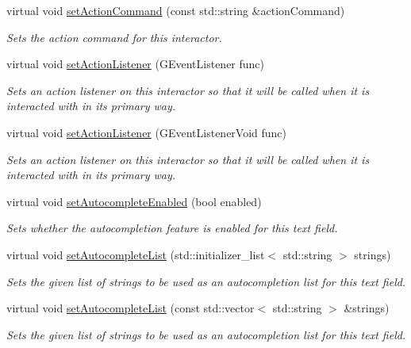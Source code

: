 \begin{DoxyCompactItemize}
virtual void \mbox{\hyperlink{classGInteractor_a4b5843fe3030e038a1ba54cc03389bcf}{set\+Action\+Command}} (const std\+::string \&action\+Command)
\begin{DoxyCompactList}\small\item\em Sets the action command for this interactor. \end{DoxyCompactList}\item 
virtual void \mbox{\hyperlink{classGInteractor_adcfb4742430c88714fcf57e57ab8ea9c}{set\+Action\+Listener}} (G\+Event\+Listener func)
\begin{DoxyCompactList}\small\item\em Sets an action listener on this interactor so that it will be called when it is interacted with in its primary way. \end{DoxyCompactList}\item 
virtual void \mbox{\hyperlink{classGInteractor_aebd20a89c7a8a43a6fce999cf4f9fcf2}{set\+Action\+Listener}} (G\+Event\+Listener\+Void func)
\begin{DoxyCompactList}\small\item\em Sets an action listener on this interactor so that it will be called when it is interacted with in its primary way. \end{DoxyCompactList}\item 
virtual void \mbox{\hyperlink{classGTextField_a173f724f6099be5a2ed423baf3433b83}{set\+Autocomplete\+Enabled}} (bool enabled)
\begin{DoxyCompactList}\small\item\em Sets whether the autocompletion feature is enabled for this text field. \end{DoxyCompactList}\item 
virtual void \mbox{\hyperlink{classGTextField_ab0245df51aa762af89f0d2cf31ce6ddd}{set\+Autocomplete\+List}} (std\+::initializer\+\_\+list$<$ std\+::string $>$ strings)
\begin{DoxyCompactList}\small\item\em Sets the given list of strings to be used as an autocompletion list for this text field. \end{DoxyCompactList}\item 
virtual void \mbox{\hyperlink{classGTextField_aee449aad44655f02ed75727b3f6dd4d6}{set\+Autocomplete\+List}} (const std\+::vector$<$ std\+::string $>$ \&strings)
\begin{DoxyCompactList}\small\item\em Sets the given list of strings to be used as an autocompletion list for this text field. \end{DoxyCompactList}\item 

\end{DoxyCompactItemize}
